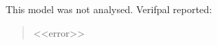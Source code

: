 \noindent This model was not analysed. Verifpal reported:

\begin{quote}\ttfamily\small\noindent <<error>>\end{quote}
